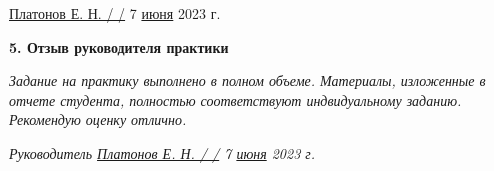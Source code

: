 \vspace{20pt}

\underline{Платонов Е. Н. / \hspace{3cm} /} 7 \underline{июня} 2023 г.

\vspace{10pt}
\pagebreak

\textbf{5. Отзыв руководителя практики}

{\em Задание на практику выполнено в полном объеме. Материалы, изложенные в отчете студента, полностью соответствуют индвидуальному заданию. Рекомендую оценку отлично. }

\vspace{30pt}

{\em Руководитель \hspace{3cm} \underline{ Платонов Е. Н. / \hspace{3cm} /} 7 \underline{июня} 2023 г.}
\pagebreak
